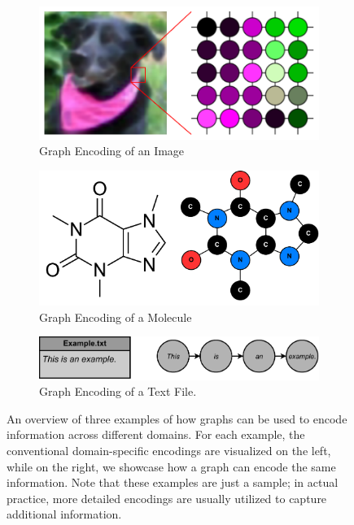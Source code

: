 \begin{figure}[!t]
 \centering
 \begin{subfigure}[b]{0.475\textwidth}
    \centering
    \includegraphics[width=\textwidth]{Figures/encoding_example.pdf}
    \caption{Graph Encoding of an Image\footnotemark}
 \end{subfigure}
 \hfill
 \begin{subfigure}[b]{0.475\textwidth}
    \centering
    \includegraphics[width=\textwidth]{Figures/Example_Encoding_Molecule.pdf}
    \caption{Graph Encoding of a Molecule\footnotemark}
 \end{subfigure}
 \par\medskip
 \begin{subfigure}[b]{0.475\textwidth}
    \centering
    \includegraphics[width=\textwidth]{Figures/Example_Encoding_Text.pdf}
    \caption{Graph Encoding of a Text File.}
 \end{subfigure}
 \caption[Caption for LOF]{An overview of three examples of how graphs can be used to encode information across different domains. For each example, the conventional domain-specific encodings are visualized on the left, while on the right, we showcase how a graph can encode the same information. Note that these examples are just a sample; in actual practice, more detailed encodings are usually utilized to capture additional information.\footnotemark}
 \label{fig:example_encodings}
\end{figure}
